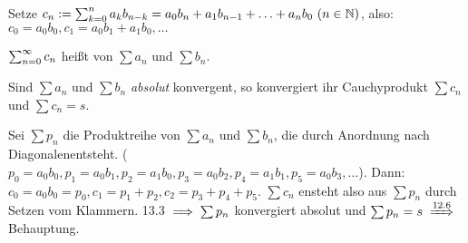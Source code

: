 \documentclass[a4paper,twoside,DIV15,BCOR12mm]{scrbook}
\begin{document}
\begin{definition}[Cauchyprodukt]
Setze $c_n := \sum_{k=0}^{n}{a_k b_{n-k}} = a_0b_n+a_1b_{n-1}+\ldots+a_nb_0\ (n\in\mathbb{N})$, also: $c_0 = a_0b_0, c_1 = a_0b_1+a_1b_0, \ldots$

$\sum_{n=0}^{\infty}{c_n}$ heißt  von $\sum{a_n}$ und $\sum{b_n}$.
\end{definition}


%
%
%

\begin{satz}
Sind $\sum{a_n}$ und $\sum{b_n}$ \emph{absolut} konvergent, so konvergiert ihr Cauchyprodukt $\sum{c_n}$ und $\sum{c_n} = s$.
\end{satz}

\begin{beweis}
Sei $\sum{p_n}$ die Produktreihe von $\sum{a_n}$ und $\sum{b_n}$, die durch \glqq Anordnung nach Diagonalen\grqq entsteht. ($p_0 = a_0b_0, p_1=a_0b_1, p_2 = a_1b_0, p_3 = a_0b_2, p_4 = a_1b_1, p_5=a_0b_3, \ldots$). Dann: $c_0  =a_0b_0 = p_0, c_1=p_1+p_2, c_2 = p_3+p_4+p_5$. $\sum{c_n}$ ensteht also aus $\sum{p_n}$ durch Setzen vom Klammern. 13.3 $\implies \sum{p_n}$ konvergiert absolut und $\sum{p_n} = s \folgtnach{12.6}$ Behauptung.
\end{beweis}
\end{document}
